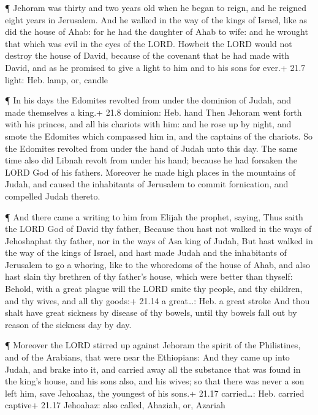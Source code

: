  ¶ Jehoram was thirty and two years old when he began to
reign, and he reigned eight years in Jerusalem.  And he
walked in the way of the kings of Israel, like as did the house of Ahab:
for he had the daughter of Ahab to wife: and he wrought that which was
evil in the eyes of the LORD.  Howbeit the LORD would not
destroy the house of David, because of the covenant that he had made
with David, and as he promised to give a light to him and to his sons
for ever.+ 21.7 light: Heb. lamp, or, candle

 ¶ In his days the Edomites revolted from under the dominion
of Judah, and made themselves a king.+ 21.8 dominion: Heb. hand
 Then Jehoram went forth with his princes, and all his
chariots with him: and he rose up by night, and smote the Edomites which
compassed him in, and the captains of the chariots.  So the
Edomites revolted from under the hand of Judah unto this day. The same
time also did Libnah revolt from under his hand; because he had forsaken
the LORD God of his fathers.  Moreover he made high places
in the mountains of Judah, and caused the inhabitants of Jerusalem to
commit fornication, and compelled Judah thereto.

 ¶ And there came a writing to him from Elijah the prophet,
saying, Thus saith the LORD God of David thy father, Because thou hast
not walked in the ways of Jehoshaphat thy father, nor in the ways of Asa
king of Judah,  But hast walked in the way of the kings of
Israel, and hast made Judah and the inhabitants of Jerusalem to go a
whoring, like to the whoredoms of the house of Ahab, and also hast slain
thy brethren of thy father's house, which were better than thyself:
 Behold, with a great plague will the LORD smite thy
people, and thy children, and thy wives, and all thy goods:+ 21.14 a
great\ldots: Heb. a great stroke  And thou shalt have great
sickness by disease of thy bowels, until thy bowels fall out by reason
of the sickness day by day.

 ¶ Moreover the LORD stirred up against Jehoram the spirit
of the Philistines, and of the Arabians, that were near the Ethiopians:
 And they came up into Judah, and brake into it, and
carried away all the substance that was found in the king's house, and
his sons also, and his wives; so that there was never a son left him,
save Jehoahaz, the youngest of his sons.+ 21.17 carried\ldots: Heb.
carried captive+ 21.17 Jehoahaz: also called, Ahaziah, or, Azariah

